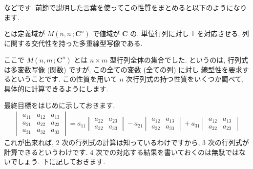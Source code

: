 \documentclass[openany, a4paper, oneside]{jsbook}
\begin{document}
などです.
前節で説明した言葉を使ってこの性質をまとめると以下のようになります.
\begin{defn}
 とは定義域が $M \left ( n,n \, ; \bm{C}^n \right)$ で値域が $\bm{C}$ の,
 単位行列に対し 1 を対応させる, 列に関する交代性を持った多重線型写像である.
\end{defn}

ここで $M \left ( n,m \, ; \bm{C}^n \right)$ とは $n \times m$ 型行列全体の集合でした.
というのは,
行列式は多変数写像 (関数) ですが, この全ての変数 (全ての列) に対し
線型性を要求するということです.
この性質を用いて $n$ 次行列式の持つ性質をいくつか調べて, 具体的に計算できるようにします.

最終目標をはじめに示しておきます.
\begin{align}
 \begin{vmatrix} a_{11} & a_{12} & a_{13} \\
  a_{21} & a_{22} & a_{23} \\
  a_{31} & a_{32} & a_{33}
 \end{vmatrix}
 =
 a_{11}
 \begin{vmatrix} a_{22} & a_{23} \\
  a_{32} & a_{33}
 \end{vmatrix}
 -a_{21}
 \begin{vmatrix}
  a_{12} & a_{13} \\
  a_{32} & a_{33}
 \end{vmatrix}
 +a_{31}
 \begin{vmatrix}
  a_{12} & a_{13} \\
  a_{22} & a_{23}
 \end{vmatrix}
\end{align}
これが出来れば, 2 次の行列式の計算は知っているわけですから, 3 次の行列式が計算できるというわけです.
4 次での対応する結果を書いておくのは無駄ではないでしょう. 下に記しておきます.
\end{document}
